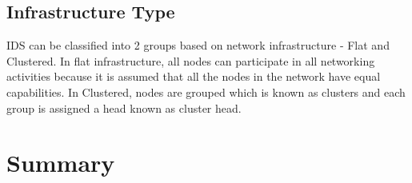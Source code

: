 \subsection{Infrastructure Type}
IDS can be classified into 2 groups based on network infrastructure - Flat and Clustered. In flat infrastructure, all nodes can participate in all networking activities because it is assumed that all the nodes in the network have equal capabilities. In Clustered, nodes are grouped which is known as clusters and each group is assigned a head known as cluster head.



\section{Summary}

